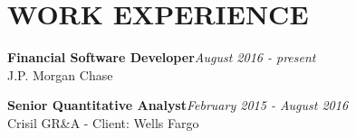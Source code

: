 \documentclass[letterpaper]{article}
\renewenvironment{itemize}{
  \begin{list}{}{
    \setlength{\leftmargin}{1.5em}
  }
}{
  \end{list}
}
\begin{document}
\section*{WORK EXPERIENCE}

\begin{itemize}
 
 \item \textbf{Financial Software Developer}\hfill \emph{August 2016 - present} \\
 J.P. Morgan Chase

 \item \textbf{Senior Quantitative Analyst}\hfill \emph{February 2015 - August 2016} \\
 Crisil GR\&A - Client: Wells Fargo
 
\end{itemize}
 
\end{document}
